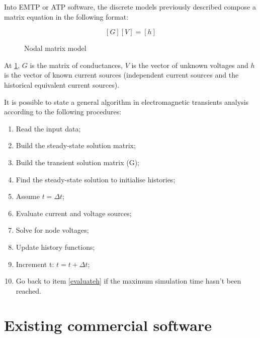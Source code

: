Into EMTP or ATP software, the discrete models previously described compose a matrix equation in the following format:

\begin{figure}[htb]
  \caption{Nodal matrix model}
  \centering
  
    \begin{subequations}
      \begin{equation}
        [G][V] = [h]
      \end{equation}
    \end{subequations}
  \label{transient3}
\end{figure}

At \ref{transient3}, $ G $ is the matrix of conductances, $ V $ is the vector of unknown voltages and $ h $ is the vector of known current sources (independent current sources and the historical equivalent current sources).

It is possible to state a general algorithm \cite{dommel1969digital} in electromagnetic transients analysis according to the following procedures:
\begin{enumerate}
  \item Read the input data;
  \item Build the steady-state solution matrix;
  \item Build the transient solution matrix (G);
  \item Find the steady-state solution to initialise histories;
  \item Assume $ t = \Delta t $;
  \item \label{evaluateh} Evaluate current and voltage sources; 
  \item Solve for node voltages;
  \item Update history functions;
  \item Increment t: $ t = t + \Delta t $;
  \item Go back to item \ref{evaluateh} if the maximum simulation time hasn't been reached.
\end{enumerate}

\section{Existing commercial software}

